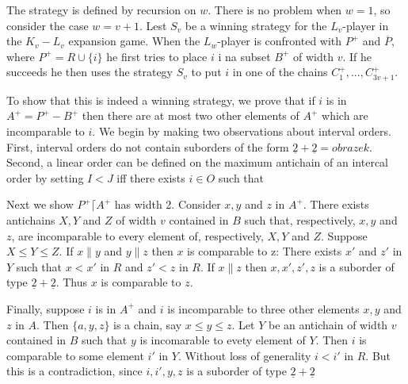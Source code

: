 \documentclass[twoside]{article}
\begin{document}
The strategy is defined by recursion on $w$. There is no problem when $w=1$, so consider
the case $w=v+1$. Lest $S_v$ be a winning strategy for the $L_v$-player in the
$K_v - L_v$ expansion game. When the $L_w$-player is confronted with $P^+$ and 
$\overline{P}$, where $P^+ = R \cup \{ i \}$ he first tries to place $i$ i na subset
$B^+$ of width $v$. If he succeeds he then uses the strategy $S_v$ to put $i$ in one of
the chains $C^+_1,...,C^+_{3v+1}$.

To show that this is indeed a winning strategy, we prove that if $i$ is in $A^+=P^+-B^+$
then there are at most two other elements of $A^+$ which are incomparable to $i$. We 
begin by making two observations about interval orders. First, interval orders do not
contain suborders of the form $\underline{2} + \underline{2} = obrazek$. Second, a linear
order can be defined on the maximum antichain of an intercal order by setting $I <J$ iff
there exists $i \in O$ such that %

Next we show  $P^+\lceil A^+$ has width 2. Consider $x,y$ and $z$ in $A^+$. There
exists antichains $X,Y$ and $Z$ of width $v$ contained in $B$ such that, respectively,
$x, y$ and $z$, are incomparable to every element of, respectively, $X,Y$ and $Z$.
Suppose $ X \leq Y \leq Z$. If $x \parallel y$ and $y \parallel z$ then $x$ is comparable
to z: There exists $x'$ and $z'$ in $Y$ such that $ x< x'$ in $R$ and $z'<z$ in $R$.
If $x \parallel z$ then $x,x',z',z$ is a suborder of type $\underline{2} +
\underline{2}$. Thus $x$ is comparable to $z$.

Finally, suppose $i$ is in $A^+$ and $i$ is incomparable to three other elements $x,y$ 
and $z$ in $A$. Then $\{a,y,z\}$ is a chain, say $x\leq y \leq z$. Let $Y$ be an
antichain of width $v$ contained in $B$ such that $y$ is incomarable to 
evety element of $Y$. Then $i$ is comparable to some element $i'$ in $Y$.
Without loss of generality $i<i'$ in $R$. But this is a contradiction, since
$i,i',y,z$ is a suborder of type $\underline{2} + \underline{2}$\\
\end{document}
